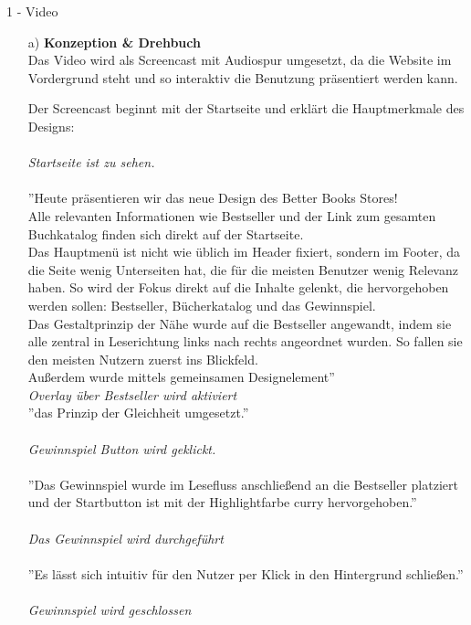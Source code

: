 \documentclass[a4paper]{article}
\begin{document}
\begin{exercise}{1 - Video} 
\begin{itemize}
\item[a)] \textbf{Konzeption \& Drehbuch}\\
Das Video wird als Screencast mit Audiospur umgesetzt, da die Website im Vordergrund steht und so interaktiv die Benutzung präsentiert werden kann.

Der Screencast beginnt mit der Startseite und erklärt die Hauptmerkmale des Designs:\\\\
\textit{Startseite ist zu sehen.}\\\\
 ''Heute präsentieren wir das neue Design des Better Books Stores!\\ Alle relevanten Informationen wie Bestseller und der Link zum gesamten Buchkatalog finden sich direkt auf der Startseite. \\
Das Hauptmenü ist nicht wie üblich im Header fixiert, sondern im Footer, da die Seite wenig Unterseiten hat, die für die meisten Benutzer wenig Relevanz haben. So wird der Fokus direkt auf die Inhalte gelenkt, die hervorgehoben werden sollen: Bestseller, Bücherkatalog und das Gewinnspiel. \\
Das Gestaltprinzip der Nähe wurde auf die Bestseller angewandt, indem sie alle zentral in Leserichtung links nach rechts angeordnet wurden. So fallen sie den meisten Nutzern zuerst ins Blickfeld.\\ Außerdem wurde mittels gemeinsamen Designelement''\\
\textit{Overlay über Bestseller wird aktiviert}\\
''das Prinzip der Gleichheit umgesetzt.'' \\\\
\textit{Gewinnspiel Button wird geklickt.}\\\\
''Das Gewinnspiel wurde im Lesefluss anschließend an die Bestseller platziert und der Startbutton ist mit der Highlightfarbe curry hervorgehoben.''\\\\
\textit{Das Gewinnspiel wird durchgeführt}\\\\
''Es lässt sich intuitiv für den Nutzer per Klick in den Hintergrund schließen.''\\\\
\textit{Gewinnspiel wird geschlossen}\\\\

\end{itemize}
\end{exercise}
\end{document}
